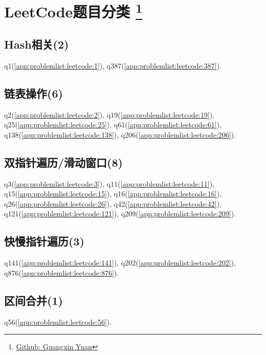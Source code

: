 \section{LeetCode题目分类%
\footnote{%
\href{https://github.com/yuanguangxin/LeetCode}{Github: Guangxin Yuan}}
}

\subsection{Hash相关(2)}
q1(\ref{app:problemlist:leetcode:1}),
q387(\ref{app:problemlist:leetcode:387}).

\subsection{链表操作(6)}
q2(\ref{app:problemlist:leetcode:2}),
q19(\ref{app:problemlist:leetcode:19}),
q25(\ref{app:problemlist:leetcode:25}),
q61(\ref{app:problemlist:leetcode:61}),
q138(\ref{app:problemlist:leetcode:138}),
q206(\ref{app:problemlist:leetcode:206}).

\subsection{双指针遍历/滑动窗口(8)}
q3(\ref{app:problemlist:leetcode:3}),
q11(\ref{app:problemlist:leetcode:11}),
q15(\ref{app:problemlist:leetcode:15}),
q16(\ref{app:problemlist:leetcode:16}),
q26(\ref{app:problemlist:leetcode:26}),
q42(\ref{app:problemlist:leetcode:42}),
q121(\ref{app:problemlist:leetcode:121}),
q209(\ref{app:problemlist:leetcode:209}).

\subsection{快慢指针遍历(3)}
q141(\ref{app:problemlist:leetcode:141}),
q202(\ref{app:problemlist:leetcode:202}),
q876(\ref{app:problemlist:leetcode:876}).

\subsection{区间合并(1)}
q56(\ref{app:problemlist:leetcode:56}).

